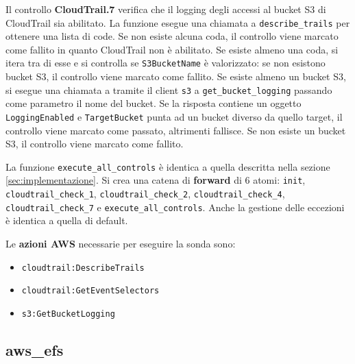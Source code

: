 Il controllo \textbf{CloudTrail.7} verifica che il logging degli accessi al bucket S3 di CloudTrail sia abilitato. La funzione esegue una chiamata a \texttt{describe\_trails} per ottenere una lista di code. Se non esiste alcuna coda, il controllo viene marcato come fallito in quanto CloudTrail non è abilitato. Se esiste almeno una coda, si itera tra di esse e si controlla se \texttt{S3BucketName} è valorizzato: se non esistono bucket S3, il controllo viene marcato come fallito. Se esiste almeno un bucket S3, si esegue una chiamata a tramite il client \texttt{s3} a \texttt{get\_bucket\_logging} passando come parametro il nome del bucket. Se la risposta contiene un oggetto \texttt{LoggingEnabled} e \texttt{TargetBucket} punta ad un bucket diverso da quello target, il controllo viene marcato come passato, altrimenti fallisce. Se non esiste un bucket S3, il controllo viene marcato come fallito.

La funzione \texttt{execute\_all\_controls} è identica a quella descritta nella sezione \ref{sec:implementazione}. Si crea una catena di \textbf{forward} di 6 atomi: \texttt{init}, \texttt{cloudtrail\_check\_1}, \texttt{cloudtrail\_check\_2}, \texttt{cloudtrail\_check\_4}, \texttt{cloudtrail\_check\_7} e \texttt{execute\_all\_controls}. Anche la gestione delle eccezioni è identica a quella di default.

\vspace{1em}

\noindent Le \textbf{azioni AWS} necessarie per eseguire la sonda sono:
\begin{itemize}
    \item \texttt{cloudtrail:DescribeTrails}
    \item \texttt{cloudtrail:GetEventSelectors}
    \item \texttt{s3:GetBucketLogging}
\end{itemize}

\subsection{aws\_efs}
\label{sec:efs}

